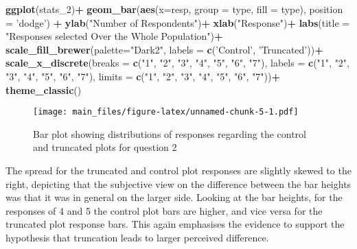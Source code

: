\documentclass[
]{article}
\newenvironment{Shaded}{\begin{snugshade}}{\end{snugshade}}
\newcommand{\DataTypeTok}[1]{\textcolor[rgb]{0.13,0.29,0.53}{#1}}
\newcommand{\DecValTok}[1]{\textcolor[rgb]{0.00,0.00,0.81}{#1}}
\newcommand{\KeywordTok}[1]{\textcolor[rgb]{0.13,0.29,0.53}{\textbf{#1}}}
\newcommand{\NormalTok}[1]{#1}
\newcommand{\OperatorTok}[1]{\textcolor[rgb]{0.81,0.36,0.00}{\textbf{#1}}}
\newcommand{\StringTok}[1]{\textcolor[rgb]{0.31,0.60,0.02}{#1}}
\begin{document}
\begin{Shaded}
\begin{Highlighting}[]
\KeywordTok{ggplot}\NormalTok{(stats_}\DecValTok{2}\NormalTok{)}\OperatorTok{+}
\StringTok{  }\KeywordTok{geom_bar}\NormalTok{(}\KeywordTok{aes}\NormalTok{(}\DataTypeTok{x=}\NormalTok{resp, }\DataTypeTok{group =}\NormalTok{ type, }\DataTypeTok{fill =}\NormalTok{ type), }\DataTypeTok{position =} \StringTok{'dodge'}\NormalTok{) }\OperatorTok{+}
\StringTok{  }\KeywordTok{ylab}\NormalTok{(}\StringTok{"Number of Respondents"}\NormalTok{)}\OperatorTok{+}
\StringTok{  }\KeywordTok{xlab}\NormalTok{(}\StringTok{"Response"}\NormalTok{)}\OperatorTok{+}
\StringTok{  }\KeywordTok{labs}\NormalTok{(}\DataTypeTok{title =} \StringTok{"Responses selected Over the Whole Population"}\NormalTok{)}\OperatorTok{+}
\StringTok{  }\KeywordTok{scale_fill_brewer}\NormalTok{(}\DataTypeTok{palette=}\StringTok{"Dark2"}\NormalTok{, }\DataTypeTok{labels =} \KeywordTok{c}\NormalTok{(}\StringTok{'Control'}\NormalTok{, }\StringTok{'Truncated'}\NormalTok{))}\OperatorTok{+}
\StringTok{  }\KeywordTok{scale_x_discrete}\NormalTok{(}\DataTypeTok{breaks =} \KeywordTok{c}\NormalTok{(}\StringTok{"1"}\NormalTok{, }\StringTok{"2"}\NormalTok{, }\StringTok{"3"}\NormalTok{, }\StringTok{"4"}\NormalTok{, }\StringTok{"5"}\NormalTok{, }\StringTok{"6"}\NormalTok{, }\StringTok{"7"}\NormalTok{), }\DataTypeTok{labels =} \KeywordTok{c}\NormalTok{(}\StringTok{"1"}\NormalTok{, }\StringTok{"2"}\NormalTok{, }\StringTok{"3"}\NormalTok{, }\StringTok{"4"}\NormalTok{, }\StringTok{"5"}\NormalTok{, }\StringTok{"6"}\NormalTok{, }\StringTok{"7"}\NormalTok{), }\DataTypeTok{limits =} \KeywordTok{c}\NormalTok{(}\StringTok{"1"}\NormalTok{, }\StringTok{"2"}\NormalTok{, }\StringTok{"3"}\NormalTok{, }\StringTok{"4"}\NormalTok{, }\StringTok{"5"}\NormalTok{, }\StringTok{"6"}\NormalTok{, }\StringTok{"7"}\NormalTok{))}\OperatorTok{+}
\StringTok{  }\KeywordTok{theme_classic}\NormalTok{()}
\end{Highlighting}
\end{Shaded}

\begin{figure}
\centering
\texttt{[image: main\_files/figure-latex/unnamed-chunk-5-1.pdf]}
\caption{Bar plot showing distributions of responses regarding the
control and truncated plots for question 2}
\end{figure}

The spread for the truncated and control plot responses are slightly
skewed to the right, depicting that the subjective view on the
difference between the bar heights was that it was in general on the
larger side. Looking at the bar heights, for the responses of 4 and 5
the control plot bars are higher, and vice versa for the truncated plot
response bars. This again emphasises the evidence to support the
hypothesis that truncation leads to larger perceived difference.
\end{document}
